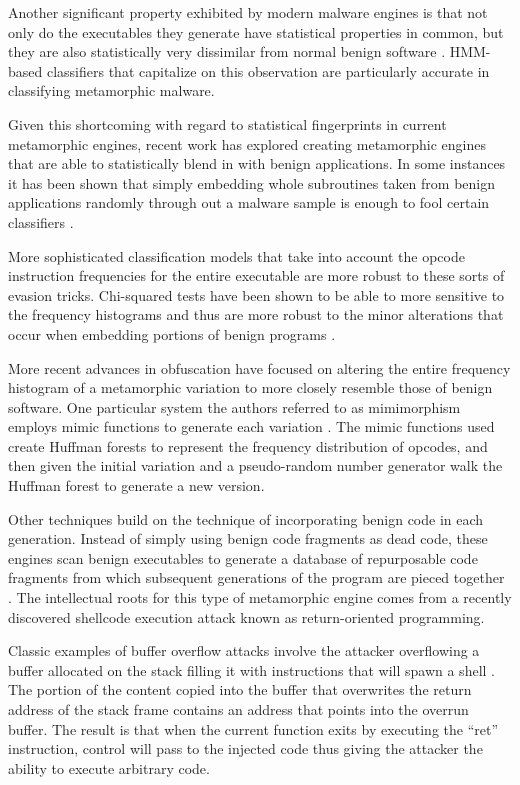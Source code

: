     Another significant property exhibited by modern malware engines is that not
    only do the executables they generate have statistical properties in common,
    but they are also statistically very dissimilar from normal benign software
    \cite{hmm_detect}. HMM-based classifiers that capitalize on this observation
    are particularly accurate in classifying metamorphic malware.

    Given this shortcoming with regard to statistical fingerprints in current
    metamorphic engines, recent work has explored creating metamorphic engines
    that are able to statistically blend in with benign applications.  In some
    instances it has been shown that simply embedding whole subroutines taken
    from benign applications randomly through out a malware sample is enough to
    fool certain classifiers \cite{hmm_evade}.

    More sophisticated classification models that take into account the opcode
    instruction frequencies for the entire executable are more robust to these
    sorts of evasion tricks. Chi-squared tests have been shown to be able to
    more sensitive to the frequency histograms and thus are more robust to the
    minor alterations that occur when embedding portions of benign programs
    \cite{chisquared}.

    More recent advances in obfuscation have focused on altering the entire
    frequency histogram of a metamorphic variation to more closely resemble
    those of benign software. One particular system the authors referred to as
    mimimorphism employs mimic functions to generate each variation
    \cite{mimimorph}. The mimic functions used create Huffman forests to
    represent the frequency distribution of opcodes, and then given the initial
    variation and a pseudo-random number generator walk the Huffman forest to
    generate a new version.

    Other techniques build on the technique of incorporating benign code in each
    generation. Instead of simply using benign code fragments as dead code,
    these engines scan benign executables to generate a database of repurposable
    code fragments from which subsequent generations of the program are pieced
    together \cite{franken}. The intellectual roots for this type of metamorphic
    engine comes from a recently discovered shellcode execution attack known as
    return-oriented programming.

    Classic examples of buffer overflow attacks involve the attacker overflowing
    a buffer allocated on the stack filling it with instructions that will spawn
    a shell \cite{aleph}. The portion of the content copied into the buffer that
    overwrites the return address of the stack frame contains an address that
    points into the overrun buffer. The result is that when the current function
    exits by executing the ``ret'' instruction, control will pass to the
    injected code thus giving the attacker the ability to execute arbitrary
    code.

